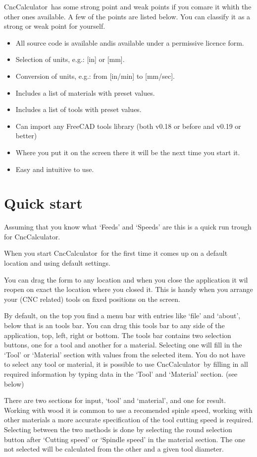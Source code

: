 \documentclass[10pt,a4paper,twoside]{report}
\newcommand{\CC}{CncCalculator}
\begin{document}
	\CC\ has some strong point and weak points if you comare it whith the other ones available.	
	A few of the points are listed below. You can classify it as a strong or weak point for yourself.
	\begin{itemize}
		\item All source code is available andis available under a permissive licence form.
		\item Selection of units, e.g.: [in] or [mm].
		\item Conversion of units, e.g.: from [in/min] to [mm/sec].
		\item Includes a list of materials with preset values.
		\item Includes a list of tools with preset values.
		\item Can import any FreeCAD tools library (both v0.18 or before and v0.19 or better)
		\item Where you put it on the screen there it will be the next time you start it.
		\item Easy and intuitive to use.
	\end{itemize}

    \newpage\section{Quick start}
    Assuming that you know what `Feeds' and `Speeds' are this is a quick run trough for \CC.
    
    When you start \CC\ for the first time it comes up on a default location and using default settings.
    
    You can drag the form to any location and when you close the application it wil reopen on exact 
    the location where you closed it. This is handy when you arrange your (CNC related) tools on fixed
    positions on the screen.
    
    By default, on the top you find a menu bar with entries like `file' and `about', below that is an
    tools bar. You can drag this tools bar to any side of the application, top, left, right or bottom.
    The tools bar contains two selection buttons, one for a tool and another for a material. Selecting
    one will fill in the `Tool' or `Material' section with values from the selected item. You do not
    have to select any tool or material, it is possible to use \CC\ by filling in all required information
    by typing data in the `Tool'  and `Material' section. (see below)
    
    There are two sections for input, `tool' and `material', and one for result. Working with wood it
    is common to use a recomended spinle speed, working with other materials a more accurate specification
    of the tool cutting speed is required. Selecting between the two methods is done by selecting the
    round selection button after `Cutting speed' or `Spindle speed' in the material section. The one
    not selected will be calculated from the other and a given tool diameter.
    
\end{document}
